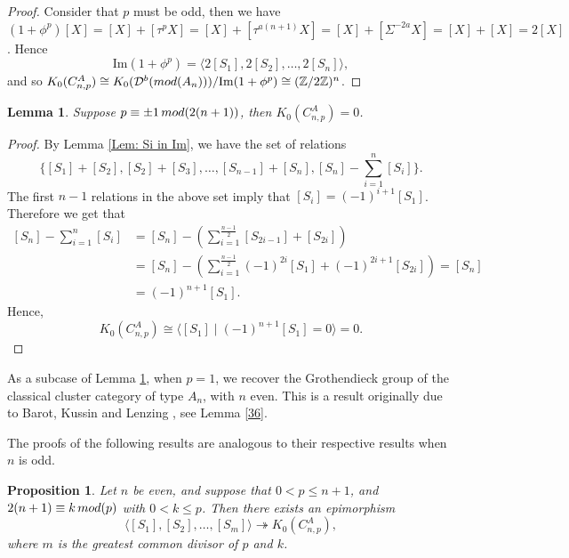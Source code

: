\documentclass[a4paper,reqno,11pt]{amsart}
\newtheorem{lemma}[theorem]{Lemma}
\newtheorem{proposition}[theorem]{Proposition}
\theoremstyle{definition}
\def\D{\mathcal{D}}
\renewcommand{\mod}{\mathop{\rm mod}\nolimits}%
\begin{document}
\begin{proof}
	Consider that $p$ must be odd, then we have $(1 + \phi^p) [X] = [X] + [\tau^p X] = [X] + [\tau^{a(n+1)} X] = [X] + [\Sigma^{-2a} X] = [X] + [X] =2[X]$.
	Hence
	\[
	\mathrm{Im}(1+ \phi^p) = \langle 2[S_1], 2[S_2], \ldots, 2[S_n] \rangle,
	\]
	and so $K_0(C_{n,p}^A) \cong K_0(\D^b(\mod(A_n)))/\mathrm{Im}(1 + \phi^p) \cong (\mathbb{Z}/2\mathbb{Z})^n$.
\end{proof}


\begin{lemma}\label{Lem: n even, p equiv 1}
	Suppose  $p \equiv \pm 1 \mod (2(n+1))$, then $K_0(C_{n,p}^A) = 0$.
\end{lemma}

\begin{proof}
	By Lemma \ref{Lem: Si in Im}, we have the set of relations
	\[
	\{[S_1] + [S_2], [S_2] + [S_3], \ldots, [S_{n-1}] + [S_n], [S_n] - \sum_{i=1}^n [S_i]\}.
	\]
	The first $n-1$ relations in the above set imply that $[S_i] = (-1)^{i+1}[S_1]$.
	Therefore we get that
$$
\begin{aligned}
{[S_n]-\sum_{i=1}^n [S_i]} &= [S_n] -  (\sum_{i=1}^{\frac{n-1}{2}} [S_{2i-1}] +[S_{2i}]) \\
&= [S_n] - (\sum_{i=1}^{\frac{n-1}{2}} (-1)^{2i}[S_1] + (-1)^{2i+1} [S_{2i}]) = [S_n]\\
 &= (-1)^{n+1}[S_1].
\end{aligned}
$$
	Hence,
	\[
	K_0(C_{n,p}^A) \cong \langle [S_1] \mid (-1)^{n+1}[S_1]=0 \rangle =0.
	\]
\end{proof}

As a subcase of Lemma \ref{Lem: n even, p equiv 1}, when $p=1$, we recover the Grothendieck group of the classical cluster category of type $A_n$, with $n$ even.
This is a result originally due to Barot, Kussin and Lenzing \cite{BKL}, see Lemma \ref{36}.

The proofs of the following results are analogous to their respective results when $n$ is odd.

\begin{proposition}\label{Prop: n even, epi to K0}
	Let $n$ be even, and suppose that $0 < p \leq n+1$, and
 $2(n+1) \equiv k \mod (p)$ with $0 < k \leq p$.
	Then there exists an epimorphism
	\[
	\langle [S_1], [S_2],\ldots, [S_m] \rangle \twoheadrightarrow K_0(C_{n,p}^A),
	\]
	where $m$ is the greatest common divisor of $p$ and $k$.
\end{proposition}
\end{document}
